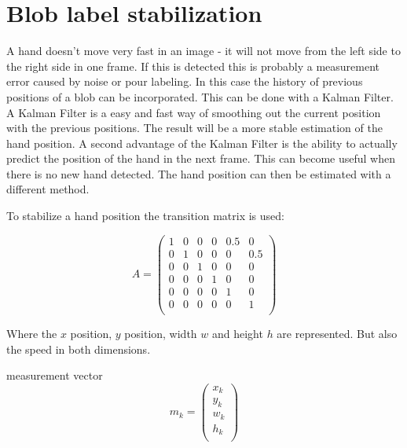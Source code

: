 \section{Blob label stabilization}
A hand doesn't move very fast in an image - it will not move from the left side to the right side in one frame. If this is detected this is probably a measurement error caused by noise or pour labeling. In this case the history of previous positions of a blob can be incorporated. This can be done with a Kalman Filter. A Kalman Filter is a easy and fast way of smoothing out the current position with the previous positions. The result will be a more stable estimation of the hand position. A second advantage of the Kalman Filter is the ability to actually predict the position of the hand in the next frame. This can become useful when there is no new hand detected. The hand position can then be estimated with a different method.

To stabilize a hand position the transition matrix is used:

\[ A = \left(
\begin{array}{cccccc}
	1 & 0 & 0 & 0 & 0.5 & 0 \\
	0 & 1 & 0 & 0 & 0 & 0.5 \\
	0 & 0 & 1 & 0 & 0 & 0 \\
	0 & 0 & 0 & 1 & 0 & 0 \\
	0 & 0 & 0 & 0 & 1 & 0 \\
	0 & 0 & 0 & 0 & 0 & 1 \\
\end{array} \right)\] 

Where the $x$ position, $y$ position, width $w$ and height $h$ are represented.  But also the speed in both dimensions.

measurement vector \[ m_k = \left(
\begin{array}{c}
	x_k \\ %
	y_k \\ %
	w_k \\ %
	h_k \\ %
\end{array} \right)\]





